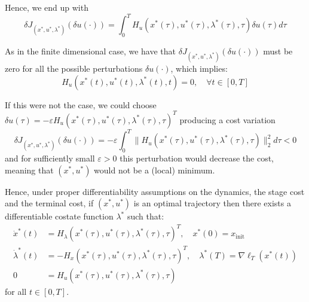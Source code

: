 \documentclass[openany]{book}
\theoremstyle{definition}
\theoremstyle{remark}
\begin{document}
Hence, we end up with
\[
    \delta J_{(x^*,u^*,\lambda^*)}(\delta u(\cdot)) = \int_0^T H_u(x^*(\tau),u^*(\tau),\lambda^*(\tau),\tau)\delta u(\tau)d\tau
\]

As in the finite dimensional case, we have that $\delta J_{(x^*,u^*,\lambda^*)}(\delta u(\cdot))$ must be zero for all the possible perturbations $\delta u(\cdot)$, which implies:
\[
    H_u(x^*(t),u^*(t),\lambda^*(t),t) = 0, \quad \forall t \in [0,T]
\]

If this were not the case, we could choose $\delta u(\tau) = -\varepsilon H_u(x^*(\tau),u^*(\tau),\lambda^*(\tau),\tau)^T$ producing a cost variation
\[
    \delta J_{(x^*,u^*,\lambda^*)}(\delta u(\cdot)) = -\varepsilon \int_0^T \|H_u(x^*(\tau),u^*(\tau),\lambda^*(\tau),\tau)\|_2^2 d\tau < 0 \tag{1}
\]
and for sufficiently small $\varepsilon > 0$ this perturbation would decrease the cost, meaning that $(x^*,u^*)$ would not be a (local) minimum.

Hence, under proper differentiability assumptions on the dynamics, the stage cost and the terminal cost, if $(x^*,u^*)$ is an optimal trajectory then there exists a differentiable costate function $\lambda^*$ such that:
\begin{align*}
    \dot{x}^*(t) &= H_\lambda(x^*(\tau),u^*(\tau),\lambda^*(\tau),\tau)^T, \quad x^*(0) = x_{\text{init}}\\
    \dot{\lambda}^*(t) &= -H_x(x^*(\tau),u^*(\tau),\lambda^*(\tau),\tau)^T, \quad \lambda^*(T) = \nabla\ell_T(x^*(t))\\
    0 &= H_u(x^*(\tau),u^*(\tau),\lambda^*(\tau),\tau)
\end{align*}
for all $t \in [0,T]$.
\end{document}
